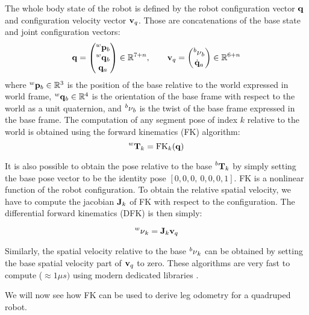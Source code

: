 The whole body state of the robot is defined by the robot configuration vector ${\bf q}$ and configuration velocity vector ${\bf v}_q$. Those are concatenations
of the base state and joint configuration vectors:
%
\begin{equation}
    {\bf q}=
    \begin{pmatrix}
        \prescript{w}{}{{\bf p}}_{b} \\
        \prescript{w}{}{{\bf q}}_b \\
        {\bf q}_a
    \end{pmatrix} \in \mathbb{R}^{7+n},
    \quad \quad
    {\bf v}_q=
    \begin{pmatrix}
        \prescript{b}{}{\mathbf{\nu}}_b  \\
        \dot{{\bf q}}_a
    \end{pmatrix}
    \label{eq:configuration} \in \mathbb{R}^{6+n}
\end{equation}
%
where $\prescript{w}{}{{\bf p}}_{b} \in \mathbb{R}^3$ is the position of the base relative to the world expressed in world frame, $\prescript{w}{}{{\bf q}}_b \in \mathbb{R}^4$ is the orientation 
of the base frame with respect to the world as a unit quaternion, and $\prescript{b}{}{\mathbf{\nu}}_b$ is the twist of the base frame expressed in the base frame.
The computation of any segment pose of index $k$ relative to the world is obtained using the forward kinematics (FK) algorithm:
%
\begin{equation}
    \prescript{w}{}{{\bf T}}_{k} = \text{FK}_k({\bf q})
\end{equation}

It is also possible to obtain the pose relative to the base $\prescript{b}{}{{\bf T}}_{k}$ by simply setting the base pose vector to be the identity pose $[0,0,0,~0,0,0,1]$.
FK is a nonlinear function of the robot configuration. To obtain the relative spatial velocity, we have to compute the jacobian ${\bf J}_k$ of FK with respect to the configuration.
The differential forward kinematics (DFK) is then simply:

\begin{equation}
    \prescript{w}{}{\mathbf{\nu}}_k = {\bf J}_k {\bf v}_q    
\end{equation}

Similarly, the spatial velocity relative to the base $\prescript{b}{}{\mathbf{\nu}}_k$ can be obtained by setting the base spatial velocity part of ${\bf v}_q$ to zero.
These algorithms are very fast to compute ($\approx 1\mu s)$ using modern dedicated libraries \cite{carpentier2019pinocchio}.

We will now see how FK can be used to derive leg odometry for a quadruped robot.

